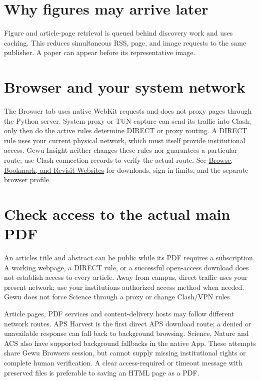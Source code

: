 \documentclass[10pt,letterpaper,oneside]{scrreprt}
\begin{document}
\section{Why figures may arrive later}\label{why-figures-may-arrive-later}

Figure and article-page retrieval is queued behind discovery work and uses caching. This reduces simultaneous RSS, page, and image requests to the same publisher. A paper can appear before its representative image.

\section{Browser and your system network}\label{browser-and-your-system-network}

The Browser tab uses native WebKit requests and does not proxy pages through the Python server. System proxy or TUN capture can send its traffic into Clash; only then do the active rules determine DIRECT or proxy routing. A DIRECT rule uses your current physical network, which must itself provide institutional access. Gewu Insight neither changes these rules nor guarantees a particular route; use Clash connection records to verify the actual route. See \hyperref[browser]{Browse, Bookmark, and Revisit Websites} for downloads, sign-in limits, and the separate browser profile.

\section{Check access to the actual main PDF}\label{check-access-to-the-actual-main-pdf}

An article\textquotesingle s title and abstract can be public while its PDF requires a subscription. A working webpage, a DIRECT rule, or a successful open-access download does not establish access to every article. Away from campus, direct traffic uses your present network; use your institution\textquotesingle s authorized access method when needed. Gewu does not force Science through a proxy or change Clash/VPN rules.

Article pages, PDF services and content-delivery hosts may follow different network routes. APS Harvest is the first direct APS download route; a denied or unavailable response can fall back to background browsing. Science, Nature and ACS also have supported background fallbacks in the native App. These attempts share Gewu Browser\textquotesingle s session, but cannot supply missing institutional rights or complete human verification. A clear access-required or timeout message with preserved files is preferable to saving an HTML page as a PDF.
\end{document}
